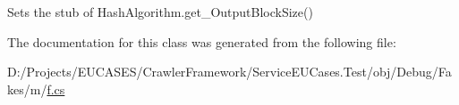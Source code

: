 Sets the stub of Hash\-Algorithm.\-get\-\_\-\-Output\-Block\-Size()



The documentation for this class was generated from the following file\-:\begin{DoxyCompactItemize}
\item 
D\-:/\-Projects/\-E\-U\-C\-A\-S\-E\-S/\-Crawler\-Framework/\-Service\-E\-U\-Cases.\-Test/obj/\-Debug/\-Fakes/m/\hyperlink{m_2f_8cs}{f.\-cs}\end{DoxyCompactItemize}
